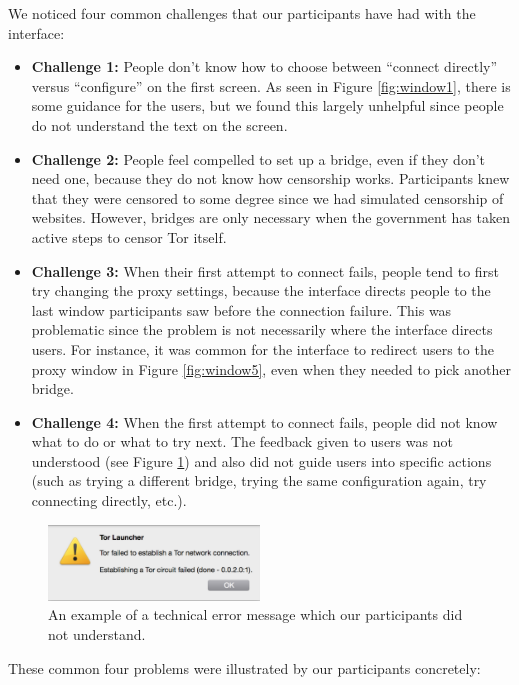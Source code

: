 \documentclass{template}
\begin{document}
We noticed four common challenges that our participants have had with the interface:  

\begin{itemize} \itemsep1pt \parskip0pt 
\item {\bfseries Challenge 1:} People don't know how to choose between ``connect directly'' versus ``configure'' on the first screen. As seen in Figure \ref{fig:window1}, there is some guidance for the users, but we found this largely unhelpful since people do not understand the text on the screen. 
\item {\bfseries Challenge 2:} People feel compelled to set up a bridge, even if they don't need one, because they do not know how censorship works. Participants knew that they were censored to some degree since we had simulated censorship of websites. However, bridges are only necessary when the government has taken active steps to censor Tor itself.
\item {\bfseries Challenge 3:} When their first attempt to connect fails, people tend to first try changing the proxy settings, because the interface directs people to the last window participants saw before the connection failure. This was problematic since the problem is not necessarily where the interface directs users. For instance, it was common for the interface to redirect users to the proxy window in Figure \ref{fig:window5}, even when they needed to pick another bridge. 
\item {\bfseries Challenge 4:} When the first attempt to connect fails, people did not know what to do or what to try next. The feedback given to users was not understood (see Figure \ref{fig:error}) and also did not guide users into specific actions (such as trying a different bridge, trying the same configuration again, try connecting directly, etc.).
\end{itemize}

\begin{figure}[t]
  \centering
    \includegraphics[width=0.5\textwidth]{error.png}
    \caption{An example of a technical error message which our participants did not understand.}
\label{fig:error}
\end{figure}

These common four problems were illustrated by our participants concretely:
\end{document}
